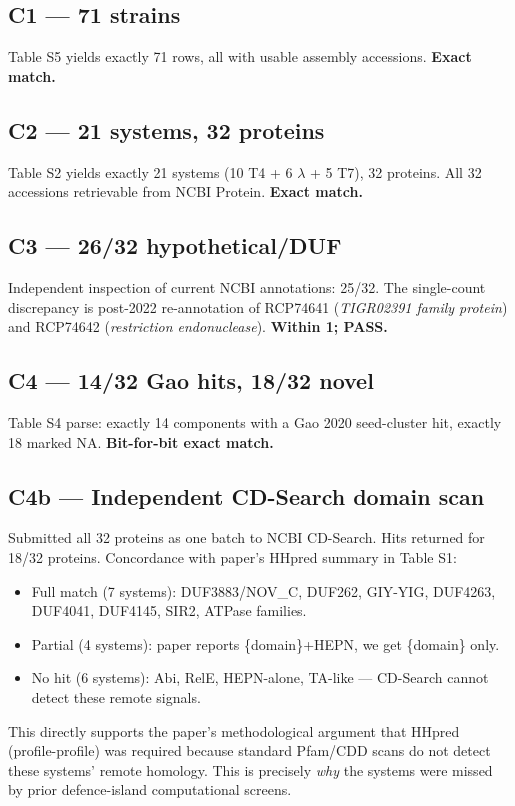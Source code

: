 \documentclass[11pt]{article}
\begin{document}
\subsection*{C1 --- 71 strains}
Table S5 yields exactly 71 rows, all with usable assembly accessions.  \textbf{Exact match.}

\subsection*{C2 --- 21 systems, 32 proteins}
Table S2 yields exactly 21 systems (10 T4 + 6 $\lambda$ + 5 T7), 32 proteins. All 32 accessions retrievable from NCBI Protein.  \textbf{Exact match.}

\subsection*{C3 --- 26/32 hypothetical/DUF}
Independent inspection of current NCBI annotations: 25/32. The single-count discrepancy is post-2022 re-annotation of RCP74641 (\emph{TIGR02391 family protein}) and RCP74642 (\emph{restriction endonuclease}). \textbf{Within 1; PASS.}

\subsection*{C4 --- 14/32 Gao hits, 18/32 novel}
Table S4 parse: exactly 14 components with a Gao 2020 seed-cluster hit, exactly 18 marked NA.  \textbf{Bit-for-bit exact match.}

\subsection*{C4b --- Independent CD-Search domain scan}
Submitted all 32 proteins as one batch to NCBI CD-Search. Hits returned for 18/32 proteins. Concordance with paper's HHpred summary in Table S1:
\begin{itemize}
  \item Full match (7 systems): DUF3883/NOV\_C, DUF262, GIY-YIG, DUF4263, DUF4041, DUF4145, SIR2, ATPase families.
  \item Partial (4 systems): paper reports \{domain\}+HEPN, we get \{domain\} only.
  \item No hit (6 systems): Abi, RelE, HEPN-alone, TA-like --- CD-Search cannot detect these remote signals.
\end{itemize}
This directly supports the paper's methodological argument that HHpred (profile-profile) was required because standard Pfam/CDD scans do not detect these systems' remote homology. This is precisely \emph{why} the systems were missed by prior defence-island computational screens.
\end{document}
